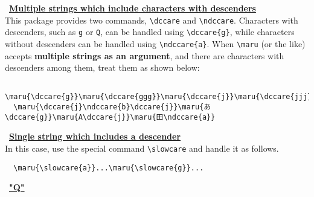 \documentclass[luatex,fontsize=10pt,paper=b5,twoside]{jlreq}%
\begin{document}
\noindent\triangleright \ \underline{\bfseries Multiple strings which include characters with descenders}\\
This package provides two commands, \verb|\dccare| and \verb|\ndccare|. Characters with descenders, such as \verb|g| or \verb|Q|, can be handled using \verb|\dccare{g}|, while characters without descenders can be handled using \verb|\ndccare{a}|. When \verb|\maru| (or the like) accepts \textbf{multiple strings as an argument}, and there are characters with descenders among them, treat them as shown below:

\begin{lstlisting}
  \maru{\dccare{g}}\maru{\dccare{ggg}}\maru{\dccare{j}}\maru{\dccare{jjj}}\maru{\ndccare{a}}
  \maru{\dccare{j}\ndccare{b}\dccare{j}}\maru{あ\dccare{g}}\maru{A\dccare{j}}\maru{田\ndccare{a}}
\end{lstlisting}

\begin{quotation}

\end{quotation}

\noindent\triangleright \ \underline{\bfseries Single string which includes a descender}\\

In this case, use the special command \verb|\slowcare| and handle it as follows.

\begin{lstlisting}
  \maru{\slowcare{a}}...\maru{\slowcare{g}}...
\end{lstlisting}

\begin{quotation}
\end{quotation}

\noindent\triangleright \ \underline{\bfseries "Q"}\\
\end{document}
